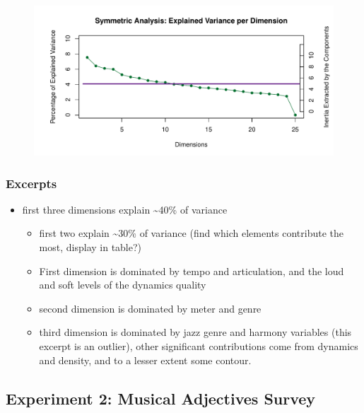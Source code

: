 \documentclass[
  english,
  man]{apa6}
\providecommand{\tightlist}{%
  \setlength{\itemsep}{0pt}\setlength{\parskip}{0pt}}
\begin{document}
\begin{figure}

{\centering \includegraphics{Music-Descriptor-Space_files/figure-latex/screeRV-1} 

}

\caption{ }\label{fig:screeRV}
\end{figure}

\hypertarget{excerpts}{%
\subsubsection{Excerpts}\label{excerpts}}

\begin{itemize}
\tightlist
\item
  first three dimensions explain \textasciitilde40\% of variance

  \begin{itemize}
  \tightlist
  \item
    first two explain \textasciitilde30\% of variance (find which elements contribute the most, display in table?)
  \item
    First dimension is dominated by tempo and articulation, and the loud and soft levels of the dynamics quality
  \item
    second dimension is dominated by meter and genre
  \item
    third dimension is dominated by jazz genre and harmony variables (this excerpt is an outlier), other significant contributions come from dynamics and density, and to a lesser extent some contour.
  \end{itemize}
\end{itemize}

\hypertarget{experiment-2-musical-adjectives-survey}{%
\subsection{Experiment 2: Musical Adjectives Survey}\label{experiment-2-musical-adjectives-survey}}
\end{document}
